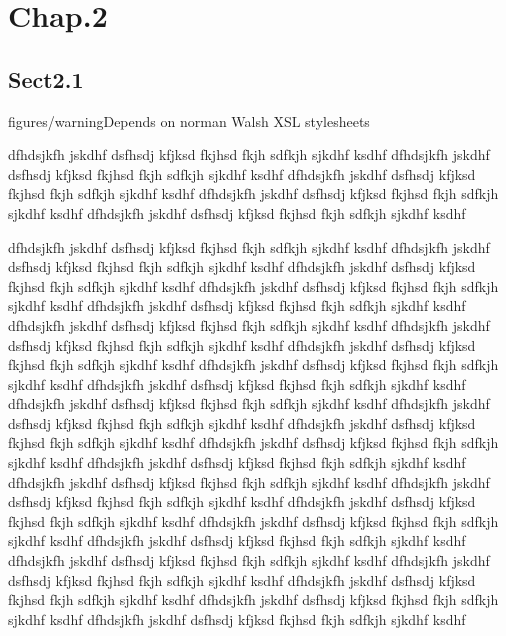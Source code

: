 
\chapter{Chap.2}
\label{outputchap2}\hypertarget{outputchap2}{}%

\section{Sect2.1}
\label{id2588808}\hypertarget{id2588808}{}%

\begin{admonition}{figures/warning}{Depends on norman Walsh XSL stylesheets}%

dfhdsjkfh jskdhf dsfhsdj kfjksd fkjhsd fkjh sdfkjh sjkdhf ksdhf
        dfhdsjkfh jskdhf dsfhsdj kfjksd fkjhsd fkjh sdfkjh sjkdhf ksdhf
        dfhdsjkfh jskdhf dsfhsdj kfjksd fkjhsd fkjh sdfkjh sjkdhf ksdhf
        dfhdsjkfh jskdhf dsfhsdj kfjksd fkjhsd fkjh sdfkjh sjkdhf ksdhf
        dfhdsjkfh jskdhf dsfhsdj kfjksd fkjhsd fkjh sdfkjh sjkdhf
        ksdhf
\end{admonition}


dfhdsjkfh jskdhf dsfhsdj kfjksd fkjhsd fkjh sdfkjh sjkdhf ksdhf
      dfhdsjkfh jskdhf dsfhsdj kfjksd fkjhsd fkjh sdfkjh sjkdhf ksdhf
      dfhdsjkfh jskdhf dsfhsdj kfjksd fkjhsd fkjh sdfkjh sjkdhf ksdhf
      dfhdsjkfh jskdhf dsfhsdj kfjksd fkjhsd fkjh sdfkjh sjkdhf ksdhf
      dfhdsjkfh jskdhf dsfhsdj kfjksd fkjhsd fkjh sdfkjh sjkdhf ksdhf
      dfhdsjkfh jskdhf dsfhsdj kfjksd fkjhsd fkjh sdfkjh sjkdhf ksdhf
      dfhdsjkfh jskdhf dsfhsdj kfjksd fkjhsd fkjh sdfkjh sjkdhf ksdhf
      dfhdsjkfh jskdhf dsfhsdj kfjksd fkjhsd fkjh sdfkjh sjkdhf ksdhf
      dfhdsjkfh jskdhf dsfhsdj kfjksd fkjhsd fkjh sdfkjh sjkdhf ksdhf
      dfhdsjkfh jskdhf dsfhsdj kfjksd fkjhsd fkjh sdfkjh sjkdhf ksdhf
      dfhdsjkfh jskdhf dsfhsdj kfjksd fkjhsd fkjh sdfkjh sjkdhf ksdhf
      dfhdsjkfh jskdhf dsfhsdj kfjksd fkjhsd fkjh sdfkjh sjkdhf ksdhf
      dfhdsjkfh jskdhf dsfhsdj kfjksd fkjhsd fkjh sdfkjh sjkdhf ksdhf
      dfhdsjkfh jskdhf dsfhsdj kfjksd fkjhsd fkjh sdfkjh sjkdhf ksdhf
      dfhdsjkfh jskdhf dsfhsdj kfjksd fkjhsd fkjh sdfkjh sjkdhf ksdhf
      dfhdsjkfh jskdhf dsfhsdj kfjksd fkjhsd fkjh sdfkjh sjkdhf ksdhf
      dfhdsjkfh jskdhf dsfhsdj kfjksd fkjhsd fkjh sdfkjh sjkdhf ksdhf
      dfhdsjkfh jskdhf dsfhsdj kfjksd fkjhsd fkjh sdfkjh sjkdhf ksdhf
      dfhdsjkfh jskdhf dsfhsdj kfjksd fkjhsd fkjh sdfkjh sjkdhf ksdhf
      dfhdsjkfh jskdhf dsfhsdj kfjksd fkjhsd fkjh sdfkjh sjkdhf ksdhf
      dfhdsjkfh jskdhf dsfhsdj kfjksd fkjhsd fkjh sdfkjh sjkdhf ksdhf
      dfhdsjkfh jskdhf dsfhsdj kfjksd fkjhsd fkjh sdfkjh sjkdhf ksdhf
      dfhdsjkfh jskdhf dsfhsdj kfjksd fkjhsd fkjh sdfkjh sjkdhf ksdhf
      dfhdsjkfh jskdhf dsfhsdj kfjksd fkjhsd fkjh sdfkjh sjkdhf ksdhf
      dfhdsjkfh jskdhf dsfhsdj kfjksd fkjhsd fkjh sdfkjh sjkdhf ksdhf
